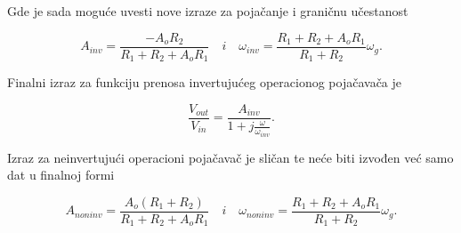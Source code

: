 {Gde je sada moguće uvesti nove izraze za pojačanje i graničnu učestanost}

\begin{equation}
    \boxed{A_{inv} = \frac{-A_oR_2}{R_1 + R_2 + A_oR_1}}
    \quad i \quad
    \boxed{\omega_{inv} = \frac{R_1 + R_2 + A_oR_1}{R_1 + R_2} \omega_g}.
\end{equation}

{Finalni izraz za funkciju prenosa invertujućeg operacionog pojačavača je}

\begin{equation}
    \frac{V_{out}}{V_{in}} = \frac{A_{inv}}{1 + j\frac{\omega}{\omega_{inv}}}.
\end{equation}

{Izraz za neinvertujući operacioni pojačavač je sličan te neće biti izvođen već samo dat u finalnoj formi}

\begin{equation}
    \boxed{A_{noninv}
    =
    \frac{A_o(R_1 + R_2)}
    {R_1 + R_2 + A_oR_1}}
    \quad i \quad
    \boxed{\omega_{noninv}
    =
    \frac{R_1 + R_2 + A_oR_1}
    {R_1 + R_2}
    \omega_g}.
\end{equation}